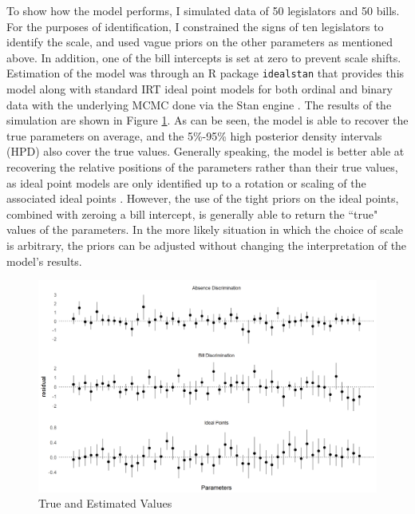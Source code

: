 	To show how the model performs, I simulated data of 50 legislators and 50 bills. For the purposes of identification, I constrained the signs of ten legislators to identify the scale, and used vague priors on the other parameters as mentioned above. In addition, one of the bill intercepts is set at zero to prevent scale shifts. Estimation of the model was through an R package \texttt{idealstan} that provides this model along with standard IRT ideal point models for both ordinal and binary data with the underlying MCMC done via the Stan engine \parencite{carpenter2017}. The results of the simulation are shown in Figure \ref{sim_results}. As can be seen, the model is able to recover the true parameters on average, and the 5\%-95\% high posterior density intervals (HPD) also cover the true values. Generally speaking, the model is better able at recovering the relative positions of the parameters rather than their true values, as ideal point models are only identified up to a rotation or scaling of the associated ideal points \parencite{gelman2005}. However, the use of the tight priors on the ideal points, combined with zeroing a bill intercept, is generally able to return the ``true" values of the parameters. In the more likely situation in which the choice of scale is arbitrary, the priors can be adjusted without changing the interpretation of the model's results. 
	
	\begin{figure}
		\caption{True and Estimated Values}\label{sim_results}
		\includegraphics[width=\linewidth]{param_resid}
	\end{figure} 
	
